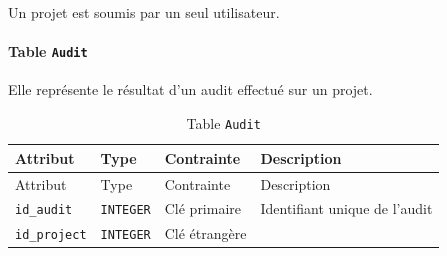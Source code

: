 \documentclass[a4paper,12pt]{article}
\begin{document}
Un projet est soumis par un seul utilisateur.

\newpage{}

\paragraph*{\texorpdfstring{Table
\texttt{Audit}}{Table Audit}}\label{table-audit}

Elle représente le résultat d'un audit effectué sur un projet.

\begin{longtable}[]{@{}
  >{\raggedright\arraybackslash}p{}
  >{\raggedright\arraybackslash}p{}
  >{\raggedright\arraybackslash}p{}
  >{\raggedright\arraybackslash}p{}@{}}
\caption{Table \protect\texttt{Audit}}\tabularnewline
\toprule\noalign{}
\begin{minipage}[b]{\linewidth}\raggedright
Attribut
\end{minipage} & \begin{minipage}[b]{\linewidth}\raggedright
Type
\end{minipage} & \begin{minipage}[b]{\linewidth}\raggedright
Contrainte
\end{minipage} & \begin{minipage}[b]{\linewidth}\raggedright
Description
\end{minipage} \\
\midrule\noalign{}
\endfirsthead
\toprule\noalign{}
\begin{minipage}[b]{\linewidth}\raggedright
Attribut
\end{minipage} & \begin{minipage}[b]{\linewidth}\raggedright
Type
\end{minipage} & \begin{minipage}[b]{\linewidth}\raggedright
Contrainte
\end{minipage} & \begin{minipage}[b]{\linewidth}\raggedright
Description
\end{minipage} \\
\midrule\noalign{}
\endhead
\bottomrule\noalign{}
\endlastfoot
\texttt{id\_audit} & \texttt{INTEGER} & Clé primaire & Identifiant
unique de l'audit \\
\texttt{id\_\allowbreak{}project} & \texttt{INTEGER} & Clé étrangère

\end{longtable}
\end{document}
